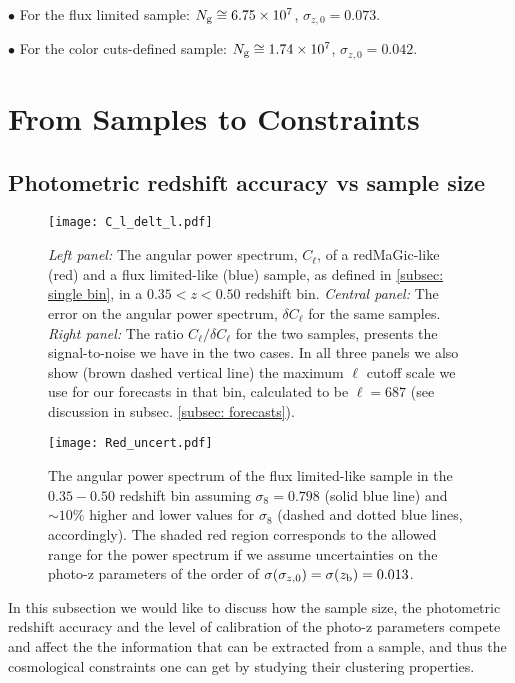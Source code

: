 \documentclass[a4paper,fleqn,usenatbib]{mnras}
\begin{document}
$\bullet$ For the flux limited sample: $N_{\mbox{\scriptsize{g}}} \cong 6.75 \times 10^7$, $\sigma_{z,0} = 0.073$.

$\bullet$ For the color cuts-defined sample: $N_{\mbox{\scriptsize{g}}} \cong 1.74 \times 10^7$, $\sigma_{z,0} = 0.042$.



\section{From Samples to Constraints}
\label{sec: Samples_Constraints}

\subsection{Photometric redshift accuracy vs sample size}


\begin{figure*}
\centering
\texttt{[image: C\_l\_delt\_l.pdf]} 
\caption{\textit{Left panel:} The angular power spectrum, $C_\ell$, of a redMaGic-like (red)  and a flux limited-like (blue) sample, as defined in \ref{subsec: single bin}, in a $0.35 < z <0.50$ redshift bin. \textit{Central panel:} The error on the angular power spectrum, $\delta C_\ell$ for the same samples. \textit{Right panel:} The ratio $C_\ell/\delta C_\ell$ for the two samples, presents the signal-to-noise we have in the two cases. In all three panels we also show (brown dashed vertical line) the maximum $\ell$ cutoff scale we use for our forecasts in that bin,  calculated to be $\ell = 687$ (see discussion in subsec. \ref{subsec: forecasts}).}
\label{fig: APS_and_Error}
\end{figure*}



\begin{figure}
\centering
\texttt{[image: Red\_uncert.pdf]} 
\caption{The angular power spectrum of the flux limited-like sample in the $0.35-0.50$ redshift bin assuming $\sigma_8 = 0.798$ (solid blue line) and $\sim10\%$ higher and lower values for $\sigma_8$ (dashed and dotted blue lines, accordingly). The shaded red region corresponds to the allowed range for the power spectrum if we assume uncertainties on the photo-z parameters of the order of   $\sigma(\sigma_{z,0}) = \sigma(z_{\mbox{\scriptsize{b}}}) = 0.013$.}
\label{fig: red_uncert_eff}
\end{figure}

In this subsection we would like to discuss how the sample size, the photometric redshift accuracy and the level of calibration of the photo-z parameters compete and affect the the information that can be extracted from a sample, and thus the cosmological constraints one can get by studying their clustering properties.
\end{document}
